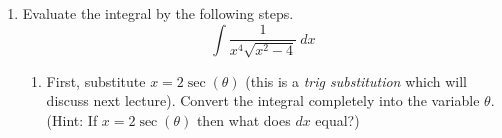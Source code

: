 \documentclass[12pt]{article}
\begin{document}
\begin{enumerate}
\begin{enumerate}
\vspace{2in}

\item $\displaystyle\int \tan^2 (x) \sec^4 (x) \ dx$

\vspace{2in}





\pagebreak

\item $\displaystyle\int {\sin (3x) \tan^2 (3x)}\ dx$


\vspace{2in}

\item $\displaystyle\int \cos^{5/2} (4-x) \sin^5 (4-x) \ dx$

\vspace{2in}

\item $\displaystyle\int \cot^3 (x) \csc (x) \ dx$

\vspace{2in}

\item $\displaystyle\int \frac{\cos^2 (x)}{\sin^4 (x)}\ dx$

\vspace{2in}

\end{enumerate} 

\newpage


\item Evaluate the integral by the following steps.
\[\displaystyle\int  \frac{1}{x^4\sqrt{x^2-4}} \ dx\]
\begin{enumerate}
\item First, substitute $x=2\sec(\theta)$ (this is a \emph{trig substitution} which will discuss next lecture). Convert the integral completely into the variable $\theta$. (Hint: If $x=2\sec(\theta)$ then what does $dx$ equal?) 


\end{enumerate}
\end{enumerate}
\end{document}

